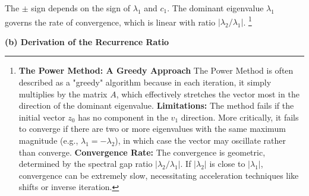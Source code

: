 \begin{solution}
The $\pm$ sign depends on the sign of $\lambda_1$ and $c_1$. The dominant eigenvalue $\lambda_1$ governs the rate of convergence, which is linear with ratio $|\lambda_2/\lambda_1|$. \footnote{\textbf{The Power Method: A Greedy Approach} The Power Method is often described as a "greedy" algorithm because in each iteration, it simply multiplies by the matrix $A$, which effectively stretches the vector most in the direction of the dominant eigenvalue. \textbf{Limitations:} The method fails if the initial vector $z_0$ has no component in the $v_1$ direction. More critically, it fails to converge if there are two or more eigenvalues with the same maximum magnitude (e.g., $\lambda_1 = -\lambda_2$), in which case the vector may oscillate rather than converge. \textbf{Convergence Rate:} The convergence is geometric, determined by the spectral gap ratio $|\lambda_2 / \lambda_1|$. If $|\lambda_2|$ is close to $|\lambda_1|$, convergence can be extremely slow, necessitating acceleration techniques like shifts or inverse iteration.}

\textbf{(b) Derivation of the Recurrence Ratio}


\end{solution}

